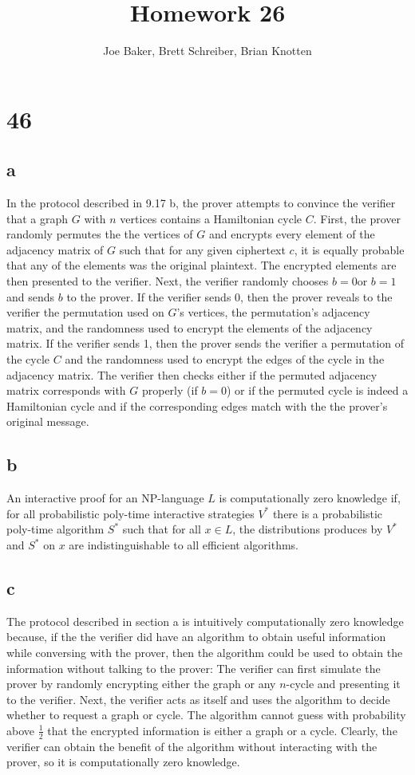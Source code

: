 \documentclass[letterpaper,notitlepage,twoside]{article}
\begin{document}
\title{Homework 26}
\author{Joe Baker, Brett Schreiber, Brian Knotten}
\maketitle
\section*{46}
\subsection*{a}
In the protocol described in 9.17 b, the prover attempts to convince the verifier that a graph $G$ with $n$ vertices contains a Hamiltonian cycle $C$. First, the prover randomly permutes the the vertices of $G$ and encrypts every element of the adjacency matrix of $G$ such that for any given ciphertext $c$, it is equally probable that any of the elements was the original plaintext. The encrypted elements are then presented to the verifier. Next, the verifier randomly chooses $b = 0 $or $b = 1$ and sends $b$ to the prover. If the verifier sends 0, then the prover reveals to the verifier the permutation used on $G$'s vertices, the permutation's adjacency matrix, and the randomness used to encrypt the elements of the adjacency matrix. If the verifier sends 1, then the prover sends the verifier a permutation of the cycle $C$ and the randomness used to encrypt the edges of the cycle in the adjacency matrix. The verifier then checks either if the permuted adjacency matrix corresponds with $G$ properly (if $b = 0$) or if the permuted cycle is indeed a Hamiltonian cycle and if the corresponding edges match with the the prover's original message. 
\subsection*{b}
An interactive proof for an NP-language $L$ is computationally zero knowledge if, for all probabilistic poly-time interactive strategies $V^{*}$ there is a probabilistic poly-time algorithm $S^{*}$ such that for all $x \in L$, the distributions produces by $V^{*}$ and $S^{*}$ on $x$ are indistinguishable to all efficient algorithms.
\subsection*{c}
The protocol described in section a is intuitively computationally zero knowledge because, if the the verifier did have an algorithm to obtain useful information while conversing with the prover, then the algorithm could be used to obtain the information without talking to the prover: The verifier can first simulate the prover by randomly encrypting either the graph or any $n$-cycle and presenting it to the verifier. Next, the verifier acts as itself and uses the algorithm to decide whether to request a graph or cycle. The algorithm cannot guess with probability above $\frac{1}{2}$ that the encrypted information is either a graph or a cycle. Clearly, the verifier can obtain the benefit of the algorithm without interacting with the prover, so it is computationally zero knowledge.
\end{document}
